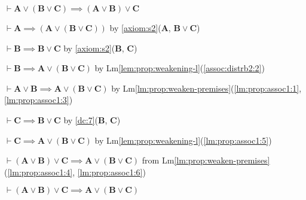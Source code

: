 \documentclass{amsart}%
\newcommand\metavariable[1]{\boldsymbol{#1}}
\begin{document}
\begin{lemma}
$\vdash\metavariable{A}\lor(\metavariable{B}\lor\metavariable{C})\implies(\metavariable{A}\lor\metavariable{B})\lor\metavariable{C}$
\end{lemma}

\begin{pf}
\item\label{lm:prop:assoc1:1} $\vdash\metavariable{A}\implies(\metavariable{A}\lor(\metavariable{B}\lor\metavariable{C}))$
  by \ref{axiom:s2}($\metavariable{A}$, $\metavariable{B}\lor\metavariable{C}$)
\item\label{assoc:distrb2:2} $\vdash\metavariable{B}\implies\metavariable{B}\lor\metavariable{C}$
  by \ref{axiom:s2}($\metavariable{B}$, $\metavariable{C}$)
\item\label{lm:prop:assoc1:3} $\vdash\metavariable{B}\implies\metavariable{A}\lor(\metavariable{B}\lor\metavariable{C})$
  by Lm\ref{lem:prop:weakening-l}(\ref{assoc:distrb2:2})
\item\label{lm:prop:assoc1:4} $\vdash\metavariable{A}\lor\metavariable{B}\implies\metavariable{A}\lor(\metavariable{B}\lor\metavariable{C})$
  by Lm\ref{lm:prop:weaken-premises}(\ref{lm:prop:assoc1:1}, \ref{lm:prop:assoc1:3})
\item\label{lm:prop:assoc1:5} $\vdash\metavariable{C}\implies\metavariable{B}\lor\metavariable{C}$
  by \ref{dc:7}($\metavariable{B}$, $\metavariable{C}$)
\item\label{lm:prop:assoc1:6} $\vdash\metavariable{C}\implies\metavariable{A}\lor(\metavariable{B}\lor\metavariable{C})$
  by Lm\ref{lem:prop:weakening-l}(\ref{lm:prop:assoc1:5})
\item $\vdash(\metavariable{A}\lor\metavariable{B})\lor\metavariable{C}\implies\metavariable{A}\lor(\metavariable{B}\lor\metavariable{C})$
  from Lm\ref{lm:prop:weaken-premises}(\ref{lm:prop:assoc1:4}, \ref{lm:prop:assoc1:6})
\end{pf}

\begin{lemma}\label{lemma:prop:disj-assoc2}
$\vdash(\metavariable{A}\lor\metavariable{B})\lor\metavariable{C}\implies\metavariable{A}\lor(\metavariable{B}\lor\metavariable{C})$
\end{lemma}
\end{document}
